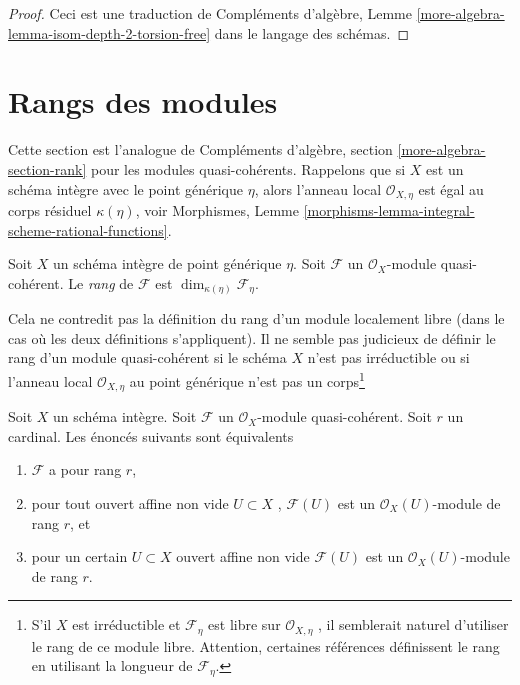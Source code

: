 \begin{proof}
Ceci est une traduction de Compléments d'algèbre, Lemme  \ref{more-algebra-lemma-isom-depth-2-torsion-free}  dans le langage des
schémas.
\end{proof}








\section{Rangs des modules}
\label{section-rank}

\noindent
Cette section est l'analogue de Compléments d'algèbre, section  \ref{more-algebra-section-rank}  pour les
modules quasi-cohérents. Rappelons que si  $X$  est un schéma intègre avec
le point générique  $\eta$, alors l'anneau local  $\mathcal{O}_{X, \eta}$  est égal au
corps résiduel  $\kappa(\eta)$, voir Morphismes, Lemme  \ref{morphisms-lemma-integral-scheme-rational-functions}.

\begin{definition}
\label{definition-rank}
Soit $X$ un schéma intègre de point générique $\eta$.
Soit  $\mathcal{F}$ un $\mathcal{O}_X$-module quasi-cohérent. Le
 {\it rang}  de  $\mathcal{F}$  est  $\dim_{\kappa(\eta)} \mathcal{F}_\eta$.
\end{definition}

\noindent
Cela ne contredit pas la définition du rang d'un module localement libre (dans le
cas où les deux définitions s'appliquent). Il ne semble pas judicieux de définir
le rang d'un module quasi-cohérent si le schéma  $X$  n'est pas
irréductible ou si l'anneau local  $\mathcal{O}_{X, \eta}$  au point générique n'est pas un
corps\footnote{S'il  $X$  est irréductible et  $\mathcal{F}_\eta$ 
est libre sur  $\mathcal{O}_{X, \eta}$ , il semblerait naturel d'utiliser le rang de ce module
libre. Attention, certaines références définissent le rang en utilisant la
longueur de  $\mathcal{F}_\eta$.}

\begin{lemma}
\label{lemma-check-rank-on-affines}
Soit  $X$  un schéma intègre. Soit  $\mathcal{F}$  un  $\mathcal{O}_X$-module
quasi-cohérent. Soit  $r$  un cardinal. Les énoncés suivants sont
équivalents
\begin{enumerate}
\item $\mathcal{F}$  a pour rang  $r$,
\item pour tout ouvert affine non vide  $U \subset X$ ,  $\mathcal{F}(U)$  est un
 $\mathcal{O}_X(U)$-module de rang  $r$, et
\item pour un certain  $U \subset X$  ouvert affine non vide  $\mathcal{F}(U)$  est un
 $\mathcal{O}_X(U)$-module de rang  $r$.
\end{enumerate}
\end{lemma}

